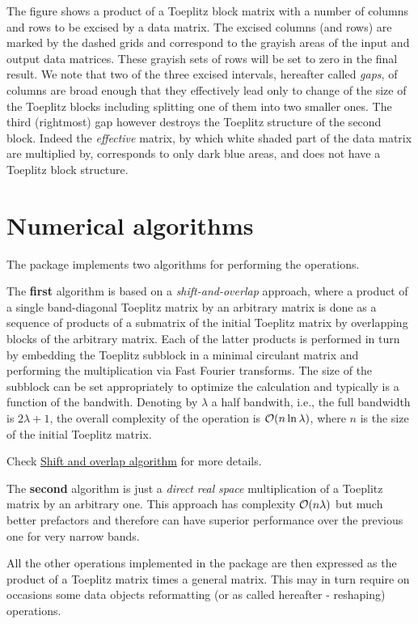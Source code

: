 The figure shows a product of a Toeplitz block matrix with a number of columns and rows to be excised by a data matrix. The excised columns (and rows) are marked by the dashed grids and correspond to the grayish areas of the input and output data matrices. These grayish sets of rows will be set to zero in the final result. We note that two of the three excised intervals, hereafter called {\itshape gaps}, of columns are broad enough that they effectively lead only to change of the size of the Toeplitz blocks including splitting one of them into two smaller ones. The third (rightmost) gap however destroys the Toeplitz structure of the second block. Indeed the {\itshape effective} matrix, by which white shaded part of the data matrix are multiplied by, corresponds to only dark blue areas, and does not have a Toeplitz block structure. \hypertarget{toeplitz_algo}{}\section{Numerical algorithms}\label{toeplitz_algo}
The package implements two algorithms for performing the operations.

The {\bfseries first} algorithm is based on a {\itshape shift-\/and-\/overlap} approach, where a product of a single band-\/diagonal Toeplitz matrix by an arbitrary matrix is done as a sequence of products of a submatrix of the initial Toeplitz matrix by overlapping blocks of the arbitrary matrix. Each of the latter products is performed in turn by embedding the Toeplitz subblock in a minimal circulant matrix and performing the multiplication via Fast Fourier transforms. The size of the subblock can be set appropriately to optimize the calculation and typically is a function of the bandwith. Denoting by $ \lambda$ a half bandwith, i.\-e., the full bandwidth is $ 2 \lambda + 1 $, the overall complexity of the operation is ${\cal O}( n \ln \lambda)$, where $ n $ is the size of the initial Toeplitz matrix.

Check \hyperlink{toeplitz_algo_shiftoverlap}{Shift and overlap algorithm} for more details.

The {\bfseries second} algorithm is just a {\itshape direct} {\itshape real} {\itshape space} multiplication of a Toeplitz matrix by an arbitrary one. This approach has complexity $ {\cal O}( n \lambda)$ but much better prefactors and therefore can have superior performance over the previous one for very narrow bands.

All the other operations implemented in the package are then expressed as the product of a Toeplitz matrix times a general matrix. This may in turn require on occasions some data objects reformatting (or as called hereafter -\/ reshaping) operations.

